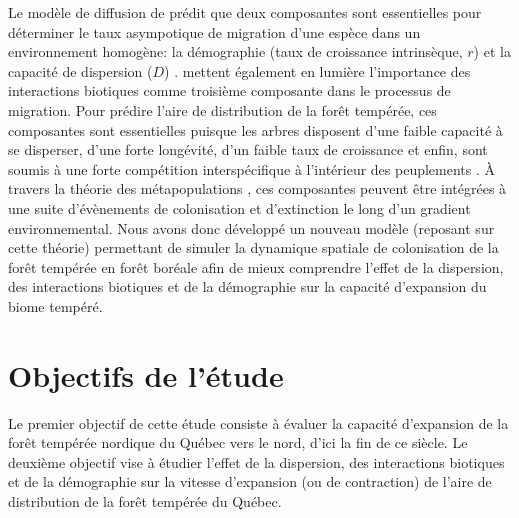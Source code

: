 Le modèle de diffusion de \citet{SKELLAM01061951} prédit que deux composantes sont essentielles pour
déterminer le taux asympotique de migration d'une espèce dans un environnement homogène: la
démographie (taux de croissance intrinsèque, $r$) et la capacité de dispersion ($D$) .
\citet{Svenning2014a} mettent également en lumière l'importance des interactions biotiques comme
troisième composante dans le processus de migration. Pour prédire l'aire de distribution de la forêt
tempérée, ces composantes sont essentielles puisque les arbres disposent d'une
faible capacité à se disperser, d'une forte longévité, d'un faible taux de croissance et enfin, sont
soumis à une forte compétition interspécifique à l'intérieur des peuplements
\citep{Renwick2014,Vanderwel2014}. À travers la théorie des métapopulations
\citep{Levins1969,Holt2000,Holt2005}, ces composantes peuvent être intégrées à une suite
d'évènements de colonisation et d'extinction le long d'un gradient environnemental. Nous avons donc
développé un nouveau modèle (reposant sur cette théorie) permettant de simuler la dynamique spatiale
de colonisation de la forêt tempérée en forêt boréale afin de mieux comprendre l'effet de la
dispersion, des interactions biotiques et de la démographie sur la capacité d'expansion du biome
tempéré.


\section*{Objectifs de l'étude}

Le premier objectif de cette étude consiste à évaluer la capacité d'expansion de la forêt tempérée nordique du Québec vers le nord, d'ici la fin de ce siècle. Le deuxième objectif vise à
étudier l'effet de la dispersion, des interactions biotiques et de la démographie sur la vitesse
d'expansion (ou de contraction) de l'aire de distribution de la forêt tempérée du Québec.

